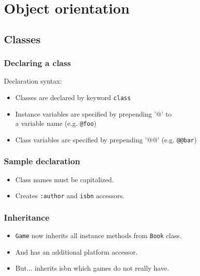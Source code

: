 \documentclass{beamer}
\begin{document}
\section{Object orientation}
\subsection{Classes}

\begin{frame}
  \frametitle{Declaring a class}
  \begin{block}{Declaration syntax:}
  \begin{itemize}
    \item Classes are declared by keyword \texttt{class}
    \item Instance variables are specified by prepending '@' to \\ a variable name (e.g. \texttt{@foo})
    \item Class variables are specified by prepending '@@' (e.g. \texttt{@@bar})
  \end{itemize}
  \end{block}
\end{frame}

\begin{frame}[t,fragile]
  \frametitle{Sample declaration}
  \begin{semiverbatim}
  \end{semiverbatim}

  \begin{itemize}
    \item<2> Class names must be capitalized. 
    \item<3> Creates \texttt{:author} and \texttt{isbn} accessors.
  \end{itemize}
\end{frame}

\begin{frame}[t,fragile]
  \frametitle{Inheritance}
  \begin{example}
    \begin{semiverbatim}
    \end{semiverbatim}
  \end{example}

  \begin{itemize}
    \item<2> \texttt{Game} now inherits all instance methods from \texttt{Book} class.
    \item<3> And has an additional platform accessor.
    \item<4> But... inherits isbn which games do not really have.
  \end{itemize}
\end{frame}
\end{document}

